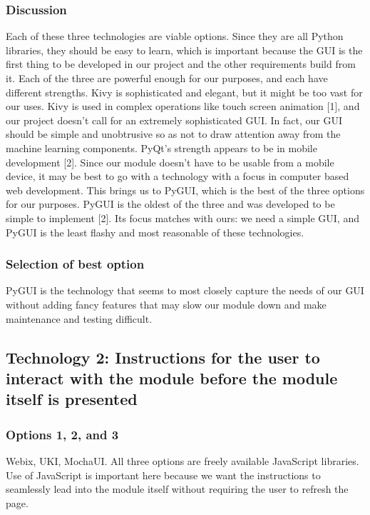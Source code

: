 \documentclass[journal,onecolumn]{IEEEtran}
\begin{document}
\subsubsection{Discussion}
Each of these three technologies are viable options. Since they are all Python libraries, they should be easy to learn, 
which is important because the GUI is the first thing to be developed in our project and the other requirements build from it. 
Each of the three are powerful enough for our purposes, and each have different strengths. Kivy is sophisticated and elegant, 
but it might be too vast for our uses. Kivy is used in complex operations like touch screen animation [1], and our project doesn't call for an 
extremely sophisticated GUI. In fact, our GUI should be simple and unobtrusive so as not to draw attention away from the machine learning components. 
PyQt's strength appears to be in mobile development [2]. Since our module doesn't have to be usable from a mobile device, it may be best to go with
 a technology with a focus in computer based web development. This brings us to PyGUI, which is the best of the three options for our purposes. 
 PyGUI is the oldest of the three and was developed to be simple to implement [2]. Its focus matches with ours: we need a simple GUI, and PyGUI is the 
 least flashy and most reasonable of these technologies.
\subsubsection{Selection of best option}
PyGUI is the technology that seems to most closely capture the needs of our GUI without adding fancy features that may slow our module down and make maintenance and testing difficult.


\subsection{Technology 2: Instructions for the user to interact with the module before the module itself is presented}

\subsubsection{Options 1, 2, and 3}
Webix, UKI, MochaUI. All three options are freely available JavaScript libraries. Use of JavaScript is important here because we want the instructions to seamlessly lead into the module itself without requiring the user to refresh the page.
\end{document}
